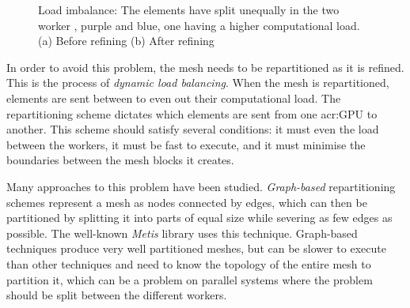 \begin{figure}[H]
	\centering
	\hfill
	\caption{Load imbalance: The elements have split unequally in the two worker , purple and blue, one having a higher computational load. (a) Before refining (b) After refining}\label{fig:intro_load_balancing}
\end{figure}

In order to avoid this problem, the mesh needs to be repartitioned as it is refined. This is the
process of \textit{dynamic load balancing}. When the mesh is repartitioned, elements are sent
between  to even out their computational load. The repartitioning scheme
dictates which elements are sent from one \acrshort{acr:GPU} to another. This scheme should satisfy
several conditions: it must even the load between the workers, it must be fast to execute, and it
must minimise the boundaries between the mesh blocks it creates. 

Many approaches to this problem have been studied. \textit{Graph-based} repartitioning schemes
represent a mesh as nodes connected by edges, which can then be partitioned by splitting it into
parts of equal size while severing as few edges as possible. The well-known
\textit{Metis}\cite{Karypis1998} library uses this technique. Graph-based techniques produce very
well partitioned meshes, but can be slower to execute than other techniques and need to know the
topology of the entire mesh to partition it, which can be a problem on parallel systems where the
problem should be split between the different workers.

